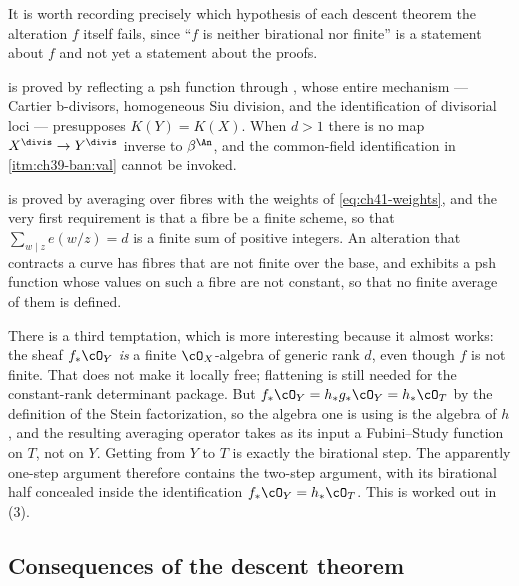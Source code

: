 \begin{remark}
\label{rem:ch42-not-one-step}
It is worth recording precisely which hypothesis of each descent theorem the
alteration $f$ itself fails, since ``$f$ is neither birational nor
finite'' is a statement about $f$ and not yet a statement about the
proofs.

 is proved by reflecting a psh function
through , whose entire mechanism --- Cartier
b-divisors, homogeneous Siu division, and the identification of divisorial
loci --- presupposes $K(Y)=K(X)$.  When $d>1$ there is no map
$X^{\divis}\to Y^{\divis}$ inverse to $\beta^{\An}$, and the common-field identification in
\,\cref{itm:ch39-ban:val} cannot be invoked.

 is proved by averaging over fibres with
the weights of \eqref{eq:ch41-weights}, and the very first requirement is
that a fibre be a finite scheme, so that
$\sum_{w\mid z}e(w/z)=d$ is a finite sum of positive integers.  An
alteration that contracts a curve has fibres that are not finite over the
base, and  exhibits a psh function whose values
on such a fibre are not constant, so that no finite average of them is
defined.

There is a third temptation, which is more interesting because it almost
works: the sheaf $f_*\cO_Y$ \emph{is} a finite $\cO_X$-algebra of
generic rank $d$, even though $f$ is not finite.  That does not
make it locally free; flattening is still needed for the constant-rank
determinant package.  But
$f_*\cO_Y=h_*g_*\cO_Y=h_*\cO_T$ by the definition of the Stein
factorization, so the algebra one is using is the algebra of $h$, and the
resulting averaging operator takes as its input a Fubini--Study function on
$T$, not on $Y$.  Getting from $Y$ to $T$ is exactly the birational
step.  The apparently one-step argument therefore contains the two-step
argument, with its birational half concealed inside the identification
$f_*\cO_Y=h_*\cO_T$.  This is worked out in
\,(3).
\end{remark}

\subsection{Consequences of the descent theorem}
\label{sec:ch42-descent-consequences}

